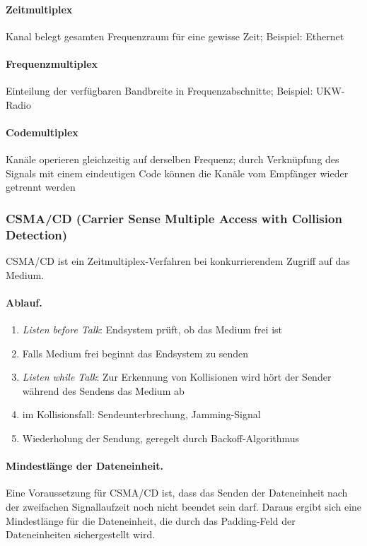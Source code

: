 \documentclass[]{scrartcl}
\begin{document}
\paragraph{Zeitmultiplex} Kanal belegt gesamten Frequenzraum f\"ur eine gewisse Zeit; Beispiel: Ethernet
\paragraph{Frequenzmultiplex} Einteilung der verf\"ugbaren Bandbreite in Frequenzabschnitte; Beispiel: UKW-Radio
\paragraph{Codemultiplex} Kan\"ale operieren gleichzeitig auf derselben Frequenz; durch Verkn\"upfung des Signals mit einem eindeutigen Code k\"onnen die Kan\"ale vom Empf\"anger wieder getrennt werden

\subsubsection{CSMA/CD (Carrier Sense Multiple Access with Collision Detection)}

CSMA/CD ist ein Zeitmultiplex-Verfahren bei konkurrierendem Zugriff auf das Medium.

\paragraph{Ablauf.} 
\begin{enumerate}
\item \emph{Listen before Talk}: Endsystem pr\"uft, ob das Medium frei ist
\item Falls Medium frei beginnt das Endsystem zu senden
\item \emph{Listen while Talk}: Zur Erkennung von Kollisionen wird h\"ort der Sender w\"ahrend des Sendens das Medium ab
\item im Kollisionsfall: Sendeunterbrechung, Jamming-Signal
\item Wiederholung der Sendung, geregelt durch Backoff-Algorithmus
\end{enumerate}

\paragraph{Mindestl\"ange der Dateneinheit.} Eine Voraussetzung f\"ur CSMA/CD ist, dass das Senden der Dateneinheit nach der zweifachen Signallaufzeit noch nicht beendet sein darf. Daraus ergibt sich eine Mindestl\"ange f\"ur die Dateneinheit, die durch das Padding-Feld der Dateneinheiten sichergestellt wird.
\end{document}
